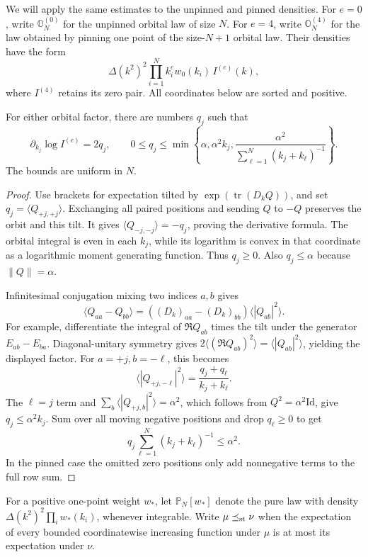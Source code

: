 We will apply the same estimates to the unpinned and pinned densities.
For $e=0$, write $\mathbb O_N^{(0)}$ for the unpinned orbital law of size
$N$. For $e=4$, write $\mathbb O_N^{(4)}$ for the law obtained by pinning
one point of the size-$N+1$ orbital law. Their densities have the form
\[
 \Delta(k^2)^2\prod_{i=1}^N k_i^e w_0(k_i)\,I^{(e)}(k),
\]
where $I^{(4)}$ retains its zero pair. All coordinates below are sorted
and positive.

\begin{lemma}\label{j:orbital-ward}
For either orbital factor, there are numbers $q_j$ such that
\[
 \partial_{k_j}\log I^{(e)}=2q_j,\qquad
 0\le q_j\le
 \min\left\{\alpha,\alpha^2k_j,
 \frac{\alpha^2}{\sum_{\ell=1}^N(k_j+k_\ell)^{-1}}\right\}.
\]
The bounds are uniform in $N$.
\end{lemma}

\begin{proof}
Use brackets for expectation tilted by
$\exp(\operatorname{tr}(D_kQ))$, and set $q_j=\langle Q_{+j,+j}\rangle$.
Exchanging all paired positions and sending $Q$ to $-Q$ preserves the
orbit and this tilt. It gives
$\langle Q_{-j,-j}\rangle=-q_j$, proving the derivative formula.
The orbital integral is even in each $k_j$, while its logarithm is
convex in that coordinate as a logarithmic moment generating function.
Thus $q_j\ge0$. Also $q_j\le\alpha$ because $\|Q\|=\alpha$.

Infinitesimal conjugation mixing two indices $a,b$ gives
\[
 \langle Q_{aa}-Q_{bb}\rangle
 =((D_k)_{aa}-(D_k)_{bb})\langle |Q_{ab}|^2\rangle.
\]
For example, differentiate the integral of $\Re Q_{ab}$ times the tilt
under the generator $E_{ab}-E_{ba}$. Diagonal-unitary symmetry gives
$2\langle(\Re Q_{ab})^2\rangle=\langle|Q_{ab}|^2\rangle$, yielding the
displayed factor. For $a=+j,b=-\ell$, this becomes
\[
 \langle |Q_{+j,-\ell}|^2\rangle
 =\frac{q_j+q_\ell}{k_j+k_\ell}.
\]
The $\ell=j$ term and
$\sum_b\langle|Q_{+j,b}|^2\rangle=\alpha^2$, which follows from
$Q^2=\alpha^2\mathrm{Id}$, give $q_j\le\alpha^2k_j$. Sum over all
moving negative positions and drop $q_\ell\ge0$ to get
\[
 q_j\sum_{\ell=1}^N(k_j+k_\ell)^{-1}\le\alpha^2.
\]
In the pinned case the omitted zero positions only add nonnegative terms
to the full row sum.
\end{proof}

For a positive one-point weight $w_*$, let $\mathbb P_N[w_*]$ denote
the pure law with density $\Delta(k^2)^2\prod_iw_*(k_i)$, whenever
integrable. Write $\mu\preceq_{\rm st}\nu$ when the expectation of every
bounded coordinatewise increasing function under $\mu$ is at most its
expectation under $\nu$.

